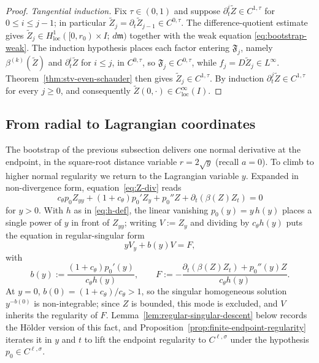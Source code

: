 \documentclass[11pt]{amsart}
\newcommand{\dd}{\,d}
\newcommand{\loc}{\mathrm{loc}}
\begin{document}
\begin{proof}
\emph{Tangential induction.} Fix \(\tau\in(0,1)\) and suppose
\(\partial_t^i\widetilde Z\in C^{1,\tau}\) for \(0\le i\le j-1\); in particular
\(\widetilde Z_j=\partial_t\widetilde Z_{j-1}\in C^{0,\tau}\). The difference-quotient
estimate gives \(\widetilde Z_j\in H^1_{\loc}([0,r_0)\times I;\dd\mathfrak m)\)
together with the weak equation \eqref{eq:bootstrap-weak}. The induction
hypothesis places each factor entering \(\mathfrak F_j\), namely \(\beta^{(k)}(\widetilde Z)\)
and \(\partial_t^i\widetilde Z\) for \(i\le j\), in \(C^{0,\tau}\), so
\(\mathfrak F_j\in C^{0,\tau}\), while \(f_j=D\widetilde Z_j\in L^\infty\).
Theorem~\ref{thm:stv-even-schauder} then gives
\(\widetilde Z_j\in C^{1,\tau}\). By induction \(\partial_t^j\widetilde Z\in C^{1,\tau}\)
for every \(j\ge0\), and consequently \(\widetilde Z(0,\cdot)\in C^\infty_{\loc}(I)\).
\end{proof}

\subsection{From radial to Lagrangian coordinates}

The bootstrap of the previous subsection delivers one normal derivative
at the endpoint, in the square-root distance variable \(r=2\sqrt y\)
(recall \(a=0\)). To climb to higher normal regularity we
return to the Lagrangian variable \(y\). Expanded in non-divergence form,
equation~\eqref{eq:Z-div} reads
\[
        c_\theta p_0 Z_{yy}+(1+c_\theta)p_0' Z_y
        +p_0''Z+\partial_t(\beta(Z)Z_t)=0
\]
for \(y>0\). With \(h\) as in \eqref{eq:h-def}, the linear vanishing
\(p_0(y)=y\,h(y)\) places a single power of \(y\) in front of \(Z_{yy}\);
writing \(V:=Z_y\) and dividing by \(c_\theta h(y)\) puts the equation in
regular-singular form
\begin{equation}
\label{eq:reg-sing-ode}
        y V_y+b(y)V=F,
\end{equation}
with
\begin{equation}
\label{eq:reg-sing-coefs}
        b(y):=\frac{(1+c_\theta)p_0'(y)}{c_\theta h(y)},
        \qquad
        F:=-\frac{\partial_t(\beta(Z)Z_t)+p_0''(y)Z}{c_\theta h(y)} .
\end{equation}
At \(y=0\), \(b(0)=(1+c_\theta)/c_\theta>1\), so the singular homogeneous
solution \(y^{-b(0)}\) is non-integrable; since \(Z\) is bounded, this
mode is excluded, and \(V\) inherits the regularity of \(F\).
Lemma~\ref{lem:regular-singular-descent} below records the H\"older
version of this fact, and Proposition~\ref{prop:finite-endpoint-regularity}
iterates it in \(y\) and \(t\) to lift the endpoint regularity to
\(C^{\ell,\sigma}\) under the hypothesis \(p_0\in C^{\ell,\sigma}\).
\end{document}
